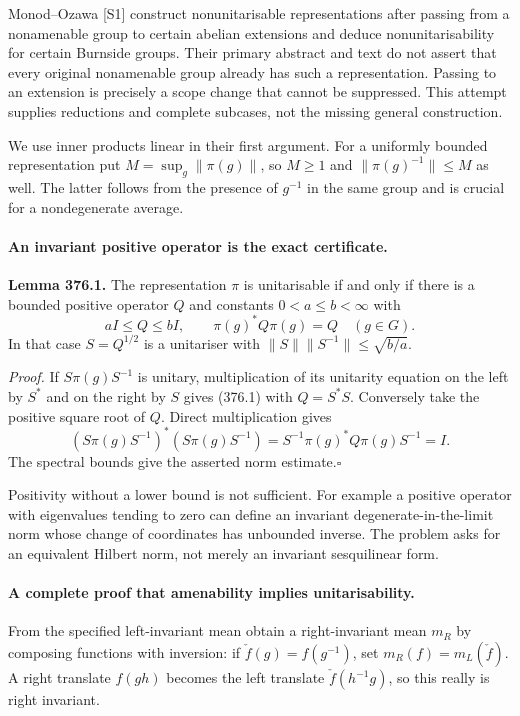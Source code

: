 \documentclass[11pt]{article}
\begin{document}
Monod--Ozawa [S1] construct nonunitarisable representations after passing
from a nonamenable group to certain abelian extensions and deduce
nonunitarisability for certain Burnside groups. Their primary abstract
and text do not assert that every original nonamenable group already
has such a representation. Passing to an extension is precisely a scope
change that cannot be suppressed. This attempt supplies reductions and
complete subcases, not the missing general construction.

We use inner products linear in their first argument. For a uniformly
bounded representation put $M=\sup_g\|\pi(g)\|$, so $M\ge1$ and
$\|\pi(g)^{-1}\|\le M$ as well. The latter follows from the presence
of $g^{-1}$ in the same group and is crucial for a nondegenerate average.

\paragraph{An invariant positive operator is the exact certificate.}
\textbf{Lemma 376.1.} The representation $\pi$ is unitarisable if and
only if there is a bounded positive operator $Q$ and constants
$0<a\le b<\infty$ with
\[
 aI\le Q\le bI,
 \qquad \pi(g)^*Q\pi(g)=Q\quad(g\in G).
 \tag{376.1}
\]
In that case $S=Q^{1/2}$ is a unitariser with
$\|S\|\|S^{-1}\|\le\sqrt{b/a}$.

\emph{Proof.} If $S\pi(g)S^{-1}$ is unitary, multiplication of its
unitarity equation on the left by $S^*$ and on the right by $S$ gives
(376.1) with $Q=S^*S$. Conversely take the positive square root of
$Q$. Direct multiplication gives
\[
 (S\pi(g)S^{-1})^*(S\pi(g)S^{-1})
   =S^{-1}\pi(g)^*Q\pi(g)S^{-1}=I.
\]
The spectral bounds give the asserted norm estimate.\hfill$\square$

Positivity without a lower bound is not sufficient. For example a
positive operator with eigenvalues tending to zero can define an
invariant degenerate-in-the-limit norm whose change of coordinates has
unbounded inverse. The problem asks for an equivalent Hilbert norm,
not merely an invariant sesquilinear form.

\paragraph{A complete proof that amenability implies unitarisability.}
From the specified left-invariant mean obtain a right-invariant mean
$m_R$ by composing functions with inversion: if
$\check f(g)=f(g^{-1})$, set $m_R(f)=m_L(\check f)$.
A right translate $f(gh)$ becomes the left translate
$\check f(h^{-1}g)$, so this really is right invariant.
\end{document}
